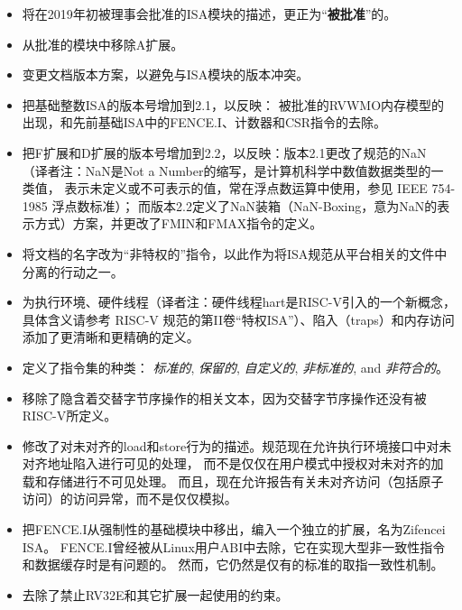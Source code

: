 \vspace{-0.2in}
\begin{itemize}
\parskip 0pt
\itemsep 1pt
\item 将在2019年初被理事会批准的ISA模块的描述，更正为“{\bf 被批准}”的。

\item 从批准的模块中移除A扩展。

\item 变更文档版本方案，以避免与ISA模块的版本冲突。

\item 把基础整数ISA的版本号增加到2.1，以反映：
  被批准的RVWMO内存模型的出现，和先前基础ISA中的FENCE.I、计数器和CSR指令的去除。

\item 把F扩展和D扩展的版本号增加到2.2，以反映：版本2.1更改了规范的NaN
（译者注：NaN是Not a Number的缩写，是计算机科学中数值数据类型的一类值，
表示未定义或不可表示的值，常在浮点数运算中使用，参见 IEEE 754-1985 浮点数标准）；
而版本2.2定义了NaN装箱（NaN-Boxing，意为NaN的表示方式）方案，并更改了FMIN和FMAX指令的定义。

\item 将文档的名字改为“非特权的”指令，以此作为将ISA规范从平台相关的文件中分离的行动之一。

\item 为执行环境、硬件线程（译者注：硬件线程hart是RISC-V引入的一个新概念，具体含义请参考 RISC-V 规范的第II卷“特权ISA”）、陷入（traps）和内存访问添加了更清晰和更精确的定义。

\item 定义了指令集的种类： {\em 标准的}, {\em 保留的}, {\em 自定义的}, {\em 非标准的}, and {\em 非符合的}。

\item 移除了隐含着交替字节序操作的相关文本，因为交替字节序操作还没有被RISC-V所定义。

\item 修改了对未对齐的load和store行为的描述。规范现在允许执行环境接口中对未对齐地址陷入进行可见的处理，
而不是仅仅在用户模式中授权对未对齐的加载和存储进行不可见处理。
而且，现在允许报告有关未对齐访问（包括原子访问）的访问异常，而不是仅仅模拟。

\item 把FENCE.I从强制性的基础模块中移出，编入一个独立的扩展，名为Zifencei ISA。
FENCE.I曾经被从Linux用户ABI中去除，它在实现大型非一致性指令和数据缓存时是有问题的。
然而，它仍然是仅有的标准的取指一致性机制。

\item 去除了禁止RV32E和其它扩展一起使用的约束。


\end{itemize}
